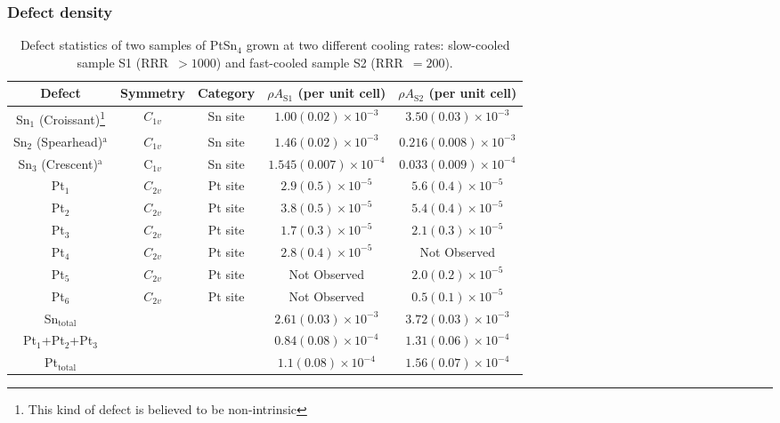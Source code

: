 \subsubsection{Defect density}

\begin{table*}
		\renewcommand{\arraystretch}{1.5}  %
		\caption{Defect statistics of two samples of PtSn$_4$ grown at two different cooling rates: slow-cooled sample S1 (\ac{RRR}~$>1000$) and fast-cooled sample S2 (\ac{RRR}~$=200$).} \label{tab:table1}
		\begin{tabular}{ccccc}
			Defect & Symmetry & Category & $\rho A_{\text{S1}}$ (per unit cell) & $\rho A_{\text{S2}}$ (per unit cell) \\ 
			\hline
			Sn$_1$ (Croissant)\footnote{This kind of defect is believed to be non-intrinsic} & $C_{1v}$ & Sn site & $1.00(0.02) \times 10^{-3}$ & $3.50(0.03) \times 10^{-3}$ \\
			Sn$_2$ (Spearhead)$^{\text{a}}$ & $C_{1v}$ & Sn site & $1.46(0.02) \times 10^{-3}$ & $0.216(0.008) \times 10^{-3}$ \\
			Sn$_3$ (Crescent)$^{\text{a}}$ & C$_{1v}$ & Sn site & $1.545(0.007) \times 10^{-4}$ & $0.033(0.009) \times 10^{-4}$ \\
			\hline
			Pt$_1$ & $C_{2v}$ & Pt site & $2.9(0.5) \times 10^{-5}$ & $5.6(0.4) \times 10^{-5}$ \\
			Pt$_2$ & $C_{2v}$ & Pt site & $3.8(0.5) \times 10^{-5}$ & $5.4(0.4) \times 10^{-5}$ \\
			Pt$_3$ & $C_{2v}$ & Pt site & $1.7(0.3) \times 10^{-5}$ & $2.1(0.3) \times 10^{-5}$ \\
			Pt$_4$ & $C_{2v}$ & Pt site & $2.8(0.4) \times 10^{-5}$ & Not Observed \\
			Pt$_5$ & $C_{2v}$ & Pt site & Not Observed & $2.0(0.2) \times 10^{-5}$ \\
			Pt$_6$ & $C_{2v}$ & Pt site & Not Observed & $0.5(0.1) \times 10^{-5}$ \\
			\hline
			Sn$_{\text{total}}$ &  &  & $2.61(0.03) \times 10^{-3}$ & $3.72(0.03) \times 10^{-3}$ \\
			Pt$_1$+Pt$_2$+Pt$_3$ &  &  & $0.84(0.08) \times 10^{-4}$ & $1.31(0.06) \times 10^{-4}$ \\
			Pt$_{\text{total}}$ &  &  & $1.1(0.08) \times 10^{-4}$ & $1.56(0.07) \times 10^{-4}$ \\
		\end{tabular}
\end{table*}

